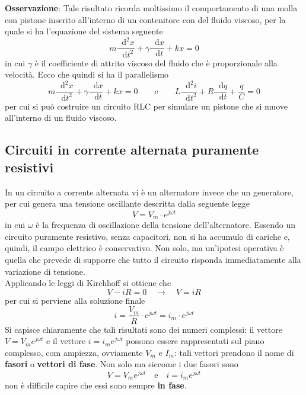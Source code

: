 \documentclass[a4paper]{extarticle}
\newcommand\dif{\mathop{}\!\mathrm{d}}
\begin{document}
\vspace{2em}
\noindent
\textbf{Osservazione}: Tale risultato ricorda moltissimo il comportamento di una molla con pistone inserito all'interno di un contenitore con del fluido viscoso, per la quale si ha l'equazione del sistema seguente
\[m \dfrac{\dif^2 x}{\dif t^2} + \gamma \dfrac{\dif x}{\dif t} + kx = 0\]
in cui $\gamma$ è il coefficiente di attrito viscoso del fluido che è proporzionale alla velocità. Ecco che quindi si ha il parallelismo
\[m \dfrac{\dif^2 x}{\dif t^2} + \gamma \dfrac{\dif x}{\dif t} + kx = 0 \hspace{2em} \text{e} \hspace{2em} L\dfrac{\dif^2 i}{\dif t^2} + R \dfrac{\dif q}{\dif t} + \dfrac{q}{C}=0\]
per cui si può costruire un circuito RLC per simulare un pistone che si muove all'interno di un fluido viscoso.

\vspace{1em}
\noindent
\subsection{Circuiti in corrente alternata puramente resistivi}
In un circuito a corrente alternata vi è un alternatore invece che un generatore, per cui genera una tensione oscillante descritta dalla seguente legge
\[V=V_m \cdot e^{j \omega t}\]
in cui $\omega$ è la frequenza di oscillazione della tensione dell'alternatore. Essendo un circuito puramente resistivo, senza capacitori, non si ha accumulo di cariche e, quindi, il campo elettrico è conservativo. Non solo, ma un'ipotesi operativa è quella che prevede di supporre che tutto il circuito risponda immediatamente alla variazione di tensione.\\
Applicando le leggi di Kirchhoff si ottiene che
\[V-iR = 0 \hspace{1em} \rightarrow \hspace{1em} V=iR\]
per cui si perviene alla soluzione finale
\[i=\dfrac{V_m}{R} \cdot e^{j \omega t} = i_m \cdot e^{j \omega t}\]
Si capisce chiaramente che tali risultati sono dei numeri complessi: il vettore $V=V_m e^{j \omega t}$ e il vettore $i=i_m e^{j \omega t}$ possono essere rappresentati sul piano complesso, com ampiezza, ovviamente $V_m$ e $I_m$: tali vettori prendono il nome di \textbf{fasori} o \textbf{vettori di fase}. Non solo ma siccome i due fasori sono
\[V=V_m e^{j \omega t} \hspace{1em} \text{e} \hspace{1em} i=i_m e^{j \omega t}\]
non è difficile capire che essi sono sempre \textbf{in fase}.
\end{document}
